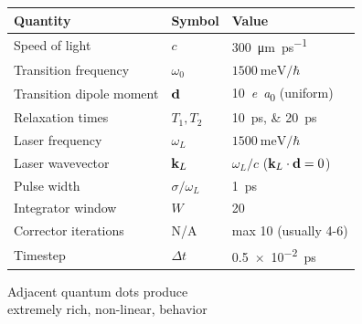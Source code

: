 \documentclass[12pt,usenames,dvipsnames]{beamer}
\begin{document}
\begin{frame}
  \begin{table}
    \begin{tabular}{lll}
      Quantity                 & Symbol            & Value                        \\ \hline \hline
      Speed of light           & $c$               & \SI{300}{\micro\meter \per \pico\second} \\
      Transition frequency     & $\omega_0$        & $\SI{1500}{\milli\eV}/\hbar$ \\
      Transition dipole moment & $\vb{d}$          & \SI{10}{\elementarycharge\bohr} (uniform) \\
      Relaxation times         & $T_{1}, T_{2}$    & \SIlist{10;20}{\pico\second} \\
      Laser frequency          & $\omega_L$        & $\SI{1500}{\milli\eV}/\hbar$ \\
      Laser wavevector         & $\vb{k}_L$        & $\omega_L/c$ ($\vb{k}_L \cdot \vb{d} = 0$) \\
      Pulse width              & $\sigma/\omega_L$ & \SI{1}{\pico\second} \\ \hline
      Integrator window        & $W$               & 20 \\
      Corrector iterations     & N/A               & max 10 (usually 4-6) \\
      Timestep                 & $\Delta t$        & \SI{0.5e-2}{\pico\second}
    \end{tabular}
  \end{table}
\end{frame}

\begin{frame}{Adjacent quantum dots produce \\ extremely rich, non-linear, behavior}
  \begin{adjustwidth}{-1.5em}{-1.5em}
  \vspace{1cm}
  \begin{columns}
    \begin{column}{0.5\textwidth}
      
    \end{column}
    \begin{column}{0.5\textwidth}
      
    \end{column}
  \end{columns}
  \end{adjustwidth}
\end{frame}
\end{document}
